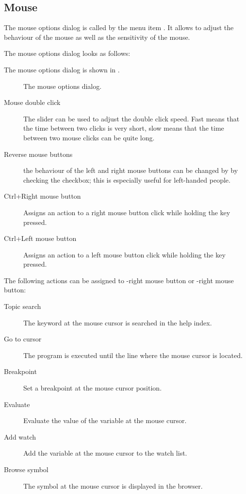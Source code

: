 \subsection{Mouse}
\label{se:prefmouse}
The mouse options dialog is called by the menu item
. It allows to adjust the behaviour of the
mouse as well as the sensitivity of the mouse.
\begin{htmlonly}
The mouse options dialog looks as follows:
\end{htmlonly}
\begin{latexonly}
The mouse options dialog is shown in .
\begin{figure}[ht]
\begin{center}
\caption{The mouse options dialog.}\label{fig:omouse}
\ifpdf
{}
\else
{}
\fi
\end{center}
\end{figure}
\end{latexonly}
\begin{description}
\item[Mouse double click]
The slider can be used to adjust the double click speed. Fast means that the
time between two clicks is very short, slow means that the time between two
mouse clicks can be quite long.
\item[Reverse mouse buttons]
the behaviour of the left and right mouse buttons can be changed by
by checking the checkbox; this is especially useful for left-handed people.
\item[Ctrl+Right mouse button]
Assigns an action to a right mouse button click while holding the 
 key pressed.
\item[Ctrl+Left mouse button]
Assigns an action to a left mouse button click while holding the 
 key pressed.
\end{description}

The following actions can be assigned to -right mouse button or
-right mouse button:
\begin{description}
\item [Topic search] The keyword at the mouse cursor is searched in the
help index.
\item [Go to cursor] The program is executed until the line where
the mouse cursor is located.
\item [Breakpoint] Set a breakpoint at the mouse cursor position.
\item [Evaluate] Evaluate the value of the variable at the mouse
cursor.
\item [Add watch] Add the variable at the mouse cursor to the
watch list.
\item [Browse symbol] The symbol at the mouse cursor is displayed
in the browser.
\end{description}

